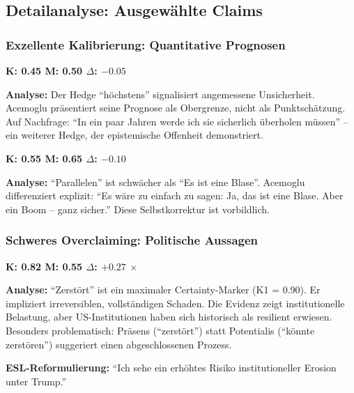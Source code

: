 \subsection{Detailanalyse: Ausgew\"ahlte Claims}

\subsubsection{Exzellente Kalibrierung: Quantitative Prognosen}

\begin{tcolorbox}[colback=green!5!white,colframe=green!50!black,title=Claim 1: H\"ochstens 0.5\% Produktivit\"atssteigerung durch KI]
\textbf{K: 0.45 \quad M: 0.50 \quad $\Delta$: $-0.05$ \quad \checkmark}

\textbf{Analyse:} Der Hedge ``h\"ochstens'' signalisiert angemessene Unsicherheit. Acemoglu pr\"asentiert seine Prognose als Obergrenze, nicht als Punktsch\"atzung. Auf Nachfrage: ``In ein paar Jahren werde ich sie sicherlich \"uberholen m\"ussen'' -- ein weiterer Hedge, der epistemische Offenheit demonstriert.
\end{tcolorbox}

\begin{tcolorbox}[colback=green!5!white,colframe=green!50!black,title=Claim 3: Es gibt Parallelen zur Dotcom-Blase]
\textbf{K: 0.55 \quad M: 0.65 \quad $\Delta$: $-0.10$ \quad \checkmark}

\textbf{Analyse:} ``Parallelen'' ist schw\"acher als ``Es ist eine Blase''. Acemoglu differenziert explizit: ``Es w\"are zu einfach zu sagen: Ja, das ist eine Blase. Aber ein Boom -- ganz sicher.'' Diese Selbstkorrektur ist vorbildlich.
\end{tcolorbox}


\subsubsection{Schweres Overclaiming: Politische Aussagen}

\begin{tcolorbox}[colback=red!5!white,colframe=red!50!black,title=Claim 9: Trump zerst\"ort die Institutionen]
\textbf{K: 0.82 \quad M: 0.55 \quad $\Delta$: $+0.27$ \quad $\times$}

\textbf{Analyse:} ``Zerst\"ort'' ist ein maximaler Certainty-Marker (K1 = 0.90). Er impliziert irreversiblen, vollst\"andigen Schaden. Die Evidenz zeigt institutionelle Belastung, aber US-Institutionen haben sich historisch als resilient erwiesen. Besonders problematisch: Pr\"asens (``zerst\"ort'') statt Potentialis (``k\"onnte zerst\"oren'') suggeriert einen abgeschlossenen Prozess.

\textbf{ESL-Reformulierung:} ``Ich sehe ein erh\"ohtes Risiko institutioneller Erosion unter Trump.''
\end{tcolorbox}

